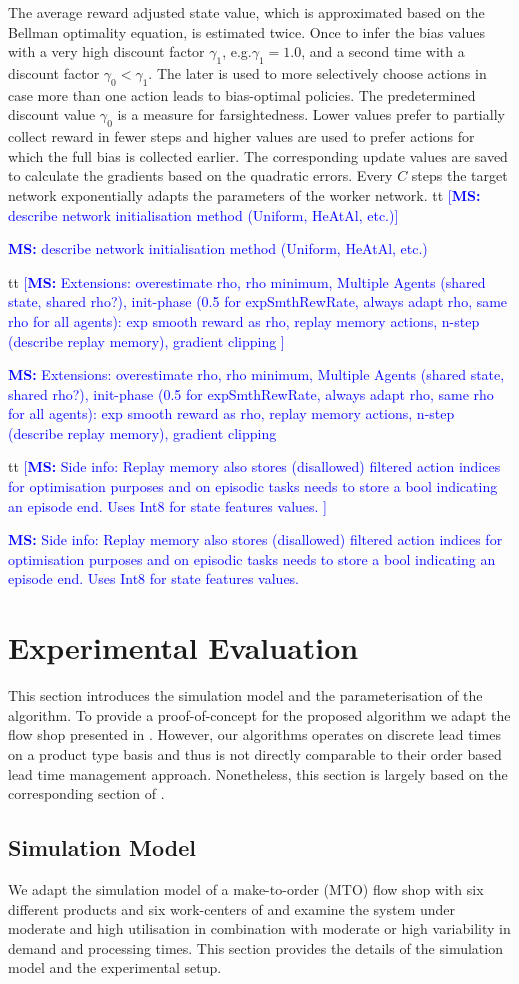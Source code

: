 \documentclass[envcountsame]{llncs}
\newcommand\MS[2][r]{\ifx t#1 \textcolor{blue}{[\textbf{MS:} #2]}
  \else \begin{center}\textcolor{blue}{\textbf{MS:} #2} \end{center} \fi}
\begin{document}
The average reward adjusted state value, which is approximated based on the Bellman optimality
equation, is estimated twice. Once to infer the bias values with a very high discount factor
\(\gamma_{1}\), e.g.\@ \(\gamma_{1} = 1.0\), and a second time with a discount factor
\(\gamma_{0} < \gamma_{1}\). The later is used to more selectively choose actions in case more than
one action leads to bias-optimal policies. The predetermined discount value \(\gamma_{0}\) is a
measure for farsightedness. Lower values prefer to partially collect reward in fewer steps and
higher values are used to prefer actions for which the full bias is collected earlier.
%
The corresponding update values are saved to calculate the gradients based on the quadratic errors.
Every \(C\) steps the target network exponentially adapts the parameters of the worker network.
%
%
%
%
\MS[t]{describe network initialisation method (Uniform, HeAtAl, etc.)}
%
\MS[t]{Extensions: overestimate rho, rho minimum, Multiple Agents (shared state,  shared rho?),
  init-phase (0.5 for expSmthRewRate, always adapt rho, same rho for all agents): exp smooth reward
  as rho, replay memory actions, n-step (describe replay memory), gradient clipping }
\MS[t]{Side info: Replay memory also stores (disallowed) filtered action indices for optimisation purposes and on
episodic tasks needs to store a bool indicating an episode end. Uses Int8 for state features values.  }


\section{Experimental Evaluation}
\label{sec:Experimental_Evaluation}


This section introduces the simulation model and the parameterisation of the algorithm. To provide a
proof-of-concept for the proposed algorithm we adapt the flow shop presented in
\citet{schneckenreither2020order}. However, our algorithms operates on discrete lead times on a
product type basis and thus is not directly comparable to their order based lead time management
approach. Nonetheless, this section is largely based on the corresponding section of
\citet{schneckenreither2020order}.

\subsection{Simulation Model}
\label{subsec:Simulation_Model}

We adapt the simulation model of a make-to-order (MTO) flow shop with six different
products and six work-centers of \citet{schneckenreither2020order} and examine the system under
moderate and high utilisation in combination with moderate or high variability in demand and
processing times. This section provides the details of the simulation model and the experimental
setup.
\end{document}
